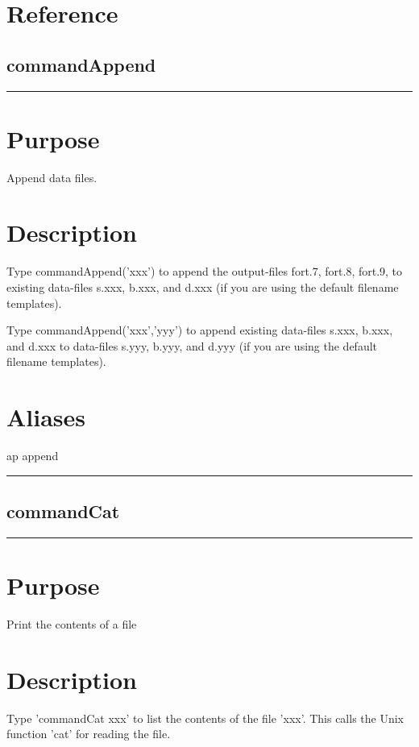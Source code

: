 \documentclass[12pt]{report}
\begin{document}
\section{ Reference }  \label{sec:clui reference}
\subsection{commandAppend} \label{sec:clui_ref_commandAppend}\begin{minipage}{6in}\hrule\medskip\section*{Purpose}
Append data files.\section*{Description}

    Type commandAppend('xxx') to append the output-files fort.7, fort.8,
    fort.9, to existing data-files s.xxx, b.xxx, and d.xxx (if you are
    using the default filename templates).

    Type commandAppend('xxx','yyy') to append existing data-files s.xxx, b.xxx,
    and d.xxx to data-files s.yyy, b.yyy, and d.yyy (if you are using
    the default filename templates).
    \section*{Aliases}
ap append \medskip\hrule\end{minipage}\subsection{commandCat} \label{sec:clui_ref_commandCat}\begin{minipage}{6in}\hrule\medskip\section*{Purpose}
Print the contents of a file\section*{Description}

    Type 'commandCat xxx' to list the contents of the file 'xxx'.  This calls the
    Unix function 'cat' for reading the file.  

\end{minipage}
\end{document}
